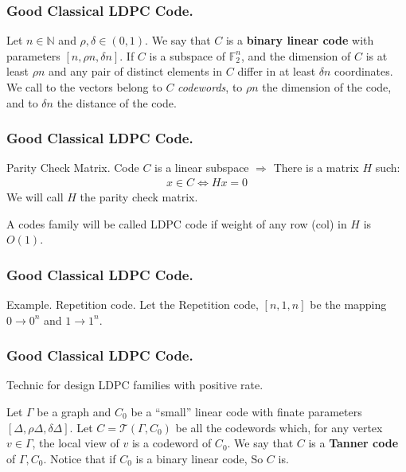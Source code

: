 \documentclass[usenames, aspectratio=169]{beamer}
\theoremstyle{claim}
\theoremstyle{remark}
\begin{document}
\begin{frame}
  \frametitle{Good Classical LDPC Code.}
\begin{definition} 
  Let $n \in \mathbb{N}$ and $\rho, \delta\in \left( 0,1 \right)$. We say that $C$ is a \textbf{binary linear code} with parameters $[n, \rho n, \delta n]$. If $C$ is a subspace of $\mathbb{F}_{2}^{n}$, and the dimension of $C$ is at least $\rho n$ and any pair of distinct elements in $C$ differ in at least $\delta n$ coordinates. We call to the vectors belong to $C$ \textit{codewords}, to $\rho n$ the dimension of the code, and to $\delta n$ the distance of the code.
  \end{definition}
\end{frame}
\begin{frame}
  \frametitle{Good Classical LDPC Code.}
  \begin{block}{Parity Check Matrix.}
    Code $C$ is a linear subspace $\Rightarrow$ There is a matrix $H$ such: 
    \begin{equation*}
      \begin{split}
        x \in C \Leftrightarrow Hx = 0 
      \end{split}
    \end{equation*}
    We will call $H$ the parity check matrix. 
  \end{block}

  \begin{definition}
    A codes family will be called LDPC code if weight of any row (col) in $H$ is $O(1)$.
  \end{definition}
\end{frame}
\begin{frame}
  \frametitle{Good Classical LDPC Code.}
  \begin{block}{Example. Repetition code.}
    Let the Repetition code, $[n, 1, n]$ be the mapping $0 \rightarrow 0^{n}$ and $1 \rightarrow 1^{n}$.   
  \end{block}
\end{frame}
\begin{frame}
  \frametitle{Good Classical LDPC Code.}
  Technic for design LDPC families with positive rate. 
 
  \begin{definition} Let $\Gamma$ be a graph and $C_{0}$ be a ``small'' linear code with finate parameters $[\Delta, \rho\Delta, \delta\Delta]$. Let $ C = \mathcal{T}\left( \Gamma, C_{0} \right)$  be all the codewords which, for any vertex $v\in \Gamma$, the local view of $v$ is a codeword of $C_{0}$. We say that $C$ is a \textbf{Tanner code}\label{Tan} of $\Gamma, C_{0}$. Notice that if $C_{0}$ is a binary linear code, So $C$ is.  
  \end{definition}

\end{frame}
\end{document}
